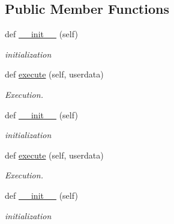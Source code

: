 \subsection*{Public Member Functions}
\begin{DoxyCompactItemize}
\item 
\mbox{\label{classstate__machine_1_1Play_a5993a23d8be7f7b2647f71ede0334957}} 
def \hyperlink{classstate__machine_1_1Play_a5993a23d8be7f7b2647f71ede0334957}{\+\_\+\+\_\+init\+\_\+\+\_\+} (self)
\begin{DoxyCompactList}\small\item\em initialization \end{DoxyCompactList}\item 
\mbox{\label{classstate__machine_1_1Play_a04168d6842960585b4bbcf58f950547b}} 
def \hyperlink{classstate__machine_1_1Play_a04168d6842960585b4bbcf58f950547b}{execute} (self, userdata)
\begin{DoxyCompactList}\small\item\em Execution. \end{DoxyCompactList}\item 
\mbox{\label{classstate__machine_1_1Play_a5993a23d8be7f7b2647f71ede0334957}} 
def \hyperlink{classstate__machine_1_1Play_a5993a23d8be7f7b2647f71ede0334957}{\+\_\+\+\_\+init\+\_\+\+\_\+} (self)
\begin{DoxyCompactList}\small\item\em initialization \end{DoxyCompactList}\item 
\mbox{\label{classstate__machine_1_1Play_a04168d6842960585b4bbcf58f950547b}} 
def \hyperlink{classstate__machine_1_1Play_a04168d6842960585b4bbcf58f950547b}{execute} (self, userdata)
\begin{DoxyCompactList}\small\item\em Execution. \end{DoxyCompactList}\item 
\mbox{\label{classstate__machine_1_1Play_a5993a23d8be7f7b2647f71ede0334957}} 
def \hyperlink{classstate__machine_1_1Play_a5993a23d8be7f7b2647f71ede0334957}{\+\_\+\+\_\+init\+\_\+\+\_\+} (self)
\begin{DoxyCompactList}\small\item\em initialization \end{DoxyCompactList}\item 

\end{DoxyCompactItemize}

